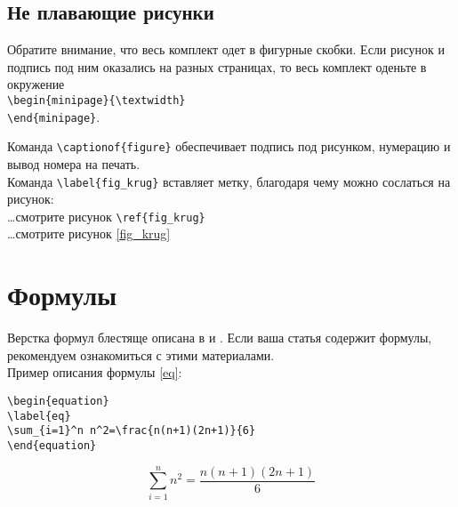 \section{Не плавающие рисунки}



Обратите внимание, что весь комплект одет в фигурные скобки.
Если рисунок и подпись под ним оказались на разных страницах, то весь комплект оденьте в окружение\\
\verb|\begin{minipage}{\textwidth}|\\
\verb|\end{minipage}|.

Команда \verb|\captionof{figure}|  обеспечивает подпись под рисунком, нумерацию и вывод номера на печать.\\
Команда \verb|\label{fig_krug}| вставляет метку, благодаря чему можно сослаться на рисунок:\\
\ldots смотрите рисунок \verb|\ref{fig_krug}|\\
\ldots смотрите рисунок \ref{fig_krug}

\chapter{Формулы}

Верстка формул блестяще описана в   \cite{__2003} и \cite{__2010}. Если ваша статья содержит формулы, рекомендуем ознакомиться с этими материалами. \\
Пример описания формулы \ref{eq}:

\begin{verbatim}
\begin{equation}
\label{eq}
\sum_{i=1}^n n^2=\frac{n(n+1)(2n+1)}{6}
\end{equation}
\end{verbatim}

\begin{equation}
\label{eq}
\sum_{i=1}^n n^2=\frac{n(n+1)(2n+1)}{6}
\end{equation}

